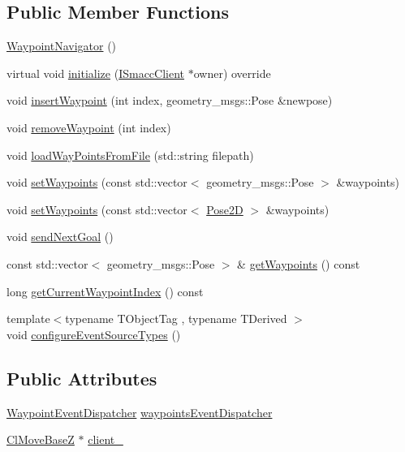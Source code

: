 \subsection*{Public Member Functions}
\begin{DoxyCompactItemize}
\item 
\hyperlink{classsmacc_1_1WaypointNavigator_a8924fe11db589727a91048ffdba2a85f}{Waypoint\+Navigator} ()
\item 
virtual void \hyperlink{classsmacc_1_1WaypointNavigator_a3b6358de6088ba60937e0748bb9af0cb}{initialize} (\hyperlink{classsmacc_1_1ISmaccClient}{I\+Smacc\+Client} $\ast$owner) override
\item 
void \hyperlink{classsmacc_1_1WaypointNavigator_abdcd86738247eccaf849903881247b0d}{insert\+Waypoint} (int index, geometry\+\_\+msgs\+::\+Pose \&newpose)
\item 
void \hyperlink{classsmacc_1_1WaypointNavigator_a4c290be90b5bfa44687f8beaa867f9b8}{remove\+Waypoint} (int index)
\item 
void \hyperlink{classsmacc_1_1WaypointNavigator_a3324ee12d697827e242b48ab3fd23edb}{load\+Way\+Points\+From\+File} (std\+::string filepath)
\item 
void \hyperlink{classsmacc_1_1WaypointNavigator_a2cb7fb208ade09ed7af4585837d051ee}{set\+Waypoints} (const std\+::vector$<$ geometry\+\_\+msgs\+::\+Pose $>$ \&waypoints)
\item 
void \hyperlink{classsmacc_1_1WaypointNavigator_a035fd5f71532fa87981a477fde5d363c}{set\+Waypoints} (const std\+::vector$<$ \hyperlink{structsmacc_1_1Pose2D}{Pose2D} $>$ \&waypoints)
\item 
void \hyperlink{classsmacc_1_1WaypointNavigator_a127438f90a00e98628ebd64b4c84b0b7}{send\+Next\+Goal} ()
\item 
const std\+::vector$<$ geometry\+\_\+msgs\+::\+Pose $>$ \& \hyperlink{classsmacc_1_1WaypointNavigator_afe1e18903d81f1d3eb20e2689f25b2ca}{get\+Waypoints} () const 
\item 
long \hyperlink{classsmacc_1_1WaypointNavigator_a6da63a864cb26b56922ca8c685e1a49c}{get\+Current\+Waypoint\+Index} () const 
\item 
{\footnotesize template$<$typename T\+Object\+Tag , typename T\+Derived $>$ }\\void \hyperlink{classsmacc_1_1WaypointNavigator_a7fc69e48021d638d86bcc8dff18f723a}{configure\+Event\+Source\+Types} ()
\end{DoxyCompactItemize}
\subsection*{Public Attributes}
\begin{DoxyCompactItemize}
\item 
\hyperlink{classsmacc_1_1WaypointEventDispatcher}{Waypoint\+Event\+Dispatcher} \hyperlink{classsmacc_1_1WaypointNavigator_aab7ff616b0eba7a5ad5f03113f2de8fd}{waypoints\+Event\+Dispatcher}
\item 
\hyperlink{classsmacc_1_1ClMoveBaseZ}{Cl\+Move\+BaseZ} $\ast$ \hyperlink{classsmacc_1_1WaypointNavigator_a2bdb0d4aea851d877fcb20e6d0897bb8}{client\+\_\+}
\end{DoxyCompactItemize}
